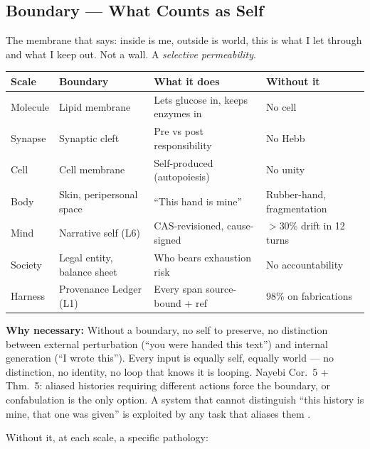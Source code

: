 \documentclass[11pt]{article}
\begin{document}
\subsection{Boundary --- What Counts as Self}

The membrane that says: inside is me, outside is world, this is what I let through and what I keep out. Not a wall. A \emph{selective permeability}.

\begin{center}
\small
\begin{tabular}{p{2.2cm}p{3.0cm}p{4.7cm}p{2.4cm}}
\toprule
Scale & Boundary & What it does & Without it \\
\midrule
Molecule & Lipid membrane & Lets glucose in, keeps enzymes in & No cell \\
Synapse & Synaptic cleft & Pre vs post responsibility & No Hebb \\
Cell & Cell membrane & Self-produced (autopoiesis) & No unity \\
Body & Skin, peripersonal space & ``This hand is mine'' & Rubber-hand, fragmentation \\
Mind & Narrative self (L6) & CAS-revisioned, cause-signed & $>$30\% drift in 12 turns \\
Society & Legal entity, balance sheet & Who bears exhaustion risk & No accountability \\
Harness & Provenance Ledger (L1) & Every span source-bound + ref & 98\% on fabrications \\
\bottomrule
\end{tabular}
\end{center}

\textbf{Why necessary:} Without a boundary, no self to preserve, no distinction between external perturbation (``you were handed this text'') and internal generation (``I wrote this''). Every input is equally self, equally world --- no distinction, no identity, no loop that knows it is looping. Nayebi Cor.~5 + Thm.~5: aliased histories requiring different actions force the boundary, or confabulation is the only option. A system that cannot distinguish ``this history is mine, that one was given'' is exploited by any task that aliases them \citep{nayebi2026}.

Without it, at each scale, a specific pathology:
\end{document}
